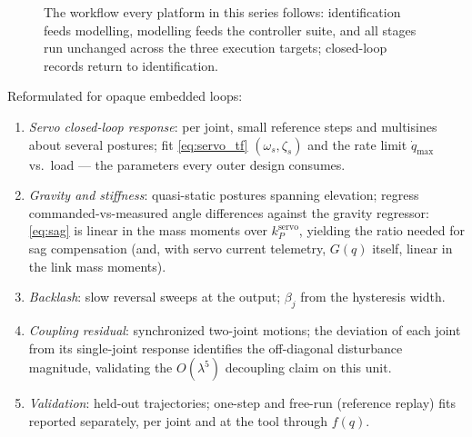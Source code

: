 \documentclass[conference]{IEEEtran}
\begin{document}
\begin{figure}[!t]
\centering
{}
\caption{The workflow every platform in this series follows: identification feeds modelling, modelling feeds the controller suite, and all stages run unchanged across the three execution targets; closed-loop records return to identification.}
\label{fig:workflow}
\end{figure}
Reformulated for opaque embedded loops:
\begin{enumerate}[label=E\arabic*)]
\item \emph{Servo closed-loop response}: per joint, small reference steps and multisines about several postures; fit \eqref{eq:servo_tf} $(\omega_s, \zeta_s)$ and the rate limit $\dot q_{\max}$ vs.\ load --- the parameters every outer design consumes.
\item \emph{Gravity and stiffness}: quasi-static postures spanning elevation; regress commanded-vs-measured angle differences against the gravity regressor: \eqref{eq:sag} is linear in the mass moments over $k_P^{\mathrm{servo}}$, yielding the ratio needed for sag compensation (and, with servo current telemetry, $G(q)$ itself, linear in the link mass moments).
\item \emph{Backlash}: slow reversal sweeps at the output; $\beta_j$ from the hysteresis width.
\item \emph{Coupling residual}: synchronized two-joint motions; the deviation of each joint from its single-joint response identifies the off-diagonal disturbance magnitude, validating the $O(\lambda^5)$ decoupling claim on this unit.
\item \emph{Validation}: held-out trajectories; one-step and free-run (reference replay) fits reported separately, per joint and at the tool through $f(q)$.
\end{enumerate}
\end{document}
